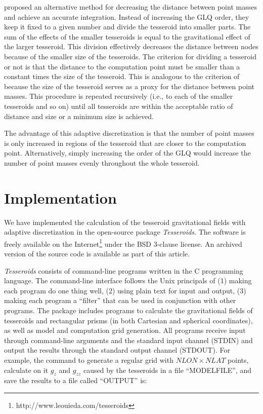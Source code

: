 \documentclass[paper,twocolumn]{geophysics}
\begin{document}
\citet{Li2011} proposed an alternative method
for decreasing the distance between point masses
and achieve an accurate integration.
Instead of increasing the GLQ order,
they keep it fixed to a given number
and divide the tesseroid into smaller parts.
The sum of the effects of the smaller tesseroids
is equal to the gravitational effect of the larger tesseroid.
This division effectively decreases
the distance between nodes because
of the smaller size of the tesseroids.
The criterion for dividing a tesseroid or not
is that the distance to the computation point
must be smaller than a constant times the size of the tesseroid.
This is analogous to the criterion of \citet{Ku1977}
because the size of the tesseroid serves as a proxy
for the distance between point masses.
This procedure is repeated recursively
(i.e., to each of the smaller tesseroids and so on)
until all tesseroids are within the acceptable
ratio of distance and size or a minimum size is achieved.


The advantage of this adaptive discretization is
that the number of point masses is only increased
in regions of the tesseroid that are
closer to the computation point.
Alternatively,
simply increasing the order of the GLQ
would increase the number of point masses
evenly throughout the whole tesseroid.

\section{Implementation}

We have implemented the calculation of
the tesseroid gravitational fields
with adaptive discretization
in the open-source package \textit{Tesseroids}.
The software is freely available
on the Internet\footnote{http://www.leouieda.com/tesseroids}
under the BSD 3-clause license.
An archived version of the source code
is available as part of this article.

\textit{Tesseroids}  consists of command-line programs
written in the C programming language.
The command-line interface follows the Unix principals of
(1) making each program do one thing well,
(2) using plain text for input and output,
(3) making each program a ``filter'' that can be used in conjunction with other
programs.
The package includes programs to calculate
the gravitational fields of tesseroids and
rectangular prisms (in both Cartesian and spherical coordinates),
as well as model and computation grid generation.
All programs receive input through
command-line arguments and the standard input channel (STDIN)
and output the results through the standard output channel (STDOUT).
For example,
the command to generate a regular grid with $NLON \times NLAT$ points,
calculate on it $g_z$ and $g_{zz}$ caused by
the tesseroids in a file ``MODELFILE'',
and save the results to a file called ``OUTPUT''
is:
\end{document}
